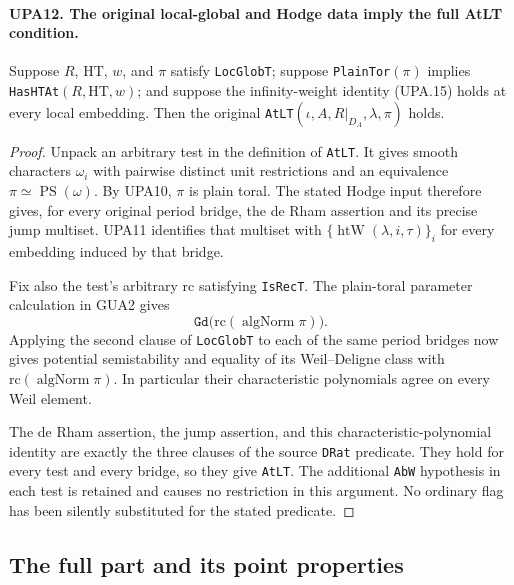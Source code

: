 \paragraph{UPA12. The original local-global and Hodge data imply the full AtLT condition.}
\label{claim:UPA12}
Suppose $R$, $\mathrm{HT}$, $w$, and $\pi$ satisfy
\texttt{LocGlobT}; suppose
\texttt{PlainTor}$(\pi)$ implies
\texttt{HasHTAt}$(R,\mathrm{HT},w)$; and suppose the
infinity-weight identity (UPA.15) holds at every local
embedding.  Then the original
\texttt{AtLT}$(\iota,A,R|_{D_A},\lambda,\pi)$ holds.
\begin{proof}
Unpack an arbitrary test in the definition of
\texttt{AtLT}.  It gives smooth characters $\omega_i$
with pairwise distinct unit restrictions and an
equivalence $\pi\simeq\operatorname{PS}(\omega)$.
By UPA10, $\pi$ is plain toral.  The stated Hodge input
therefore gives, for every original period bridge,
the de Rham assertion and its precise jump multiset.
UPA11 identifies that multiset with
$\{\operatorname{htW}(\lambda,i,\tau)\}_i$ for every
embedding induced by that bridge.

Fix also the test's arbitrary $\mathrm{rc}$ satisfying
\texttt{IsRecT}.  The plain-toral parameter calculation in
GUA2 gives
\[
           \texttt{Gd}\bigl(\mathrm{rc}
                      (\operatorname{algNorm}\pi)\bigr).
 \tag{UPA.18}
\]
Applying the second clause of \texttt{LocGlobT} to each
of the same period bridges now gives potential
semistability and equality of its Weil--Deligne class
with $\mathrm{rc}(\operatorname{algNorm}\pi)$.
In particular their characteristic polynomials agree
on every Weil element.

The de Rham assertion, the jump assertion, and this
characteristic-polynomial identity are exactly the
three clauses of the source \texttt{DRat} predicate.
They hold for every test and every bridge, so they
give \texttt{AtLT}.  The additional \texttt{AbW}
hypothesis in each test is retained and causes no
restriction in this argument.  No ordinary flag has
been silently substituted for the stated predicate.
\end{proof}

\subsection{The full part and its point properties}

